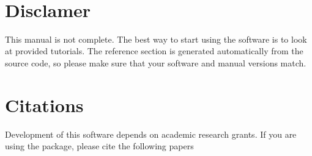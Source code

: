 \begin{titlepage}


\vspace*{1cm}

\vspace*{3cm}
\vspace*{1cm}
\vfill

\vspace*{0.5cm}
\center{\large{\today}} \\
\vspace*{0.3cm}
\end{titlepage}

\section*{Disclamer}
This manual is not complete. The best way to start using the software is to look at provided tutorials. The reference section is generated automatically from the source code, so please make sure that your software and manual versions match.  

\section*{Citations}
Development of this software depends on academic research grants. If you are using the package, please cite the  following papers \\

